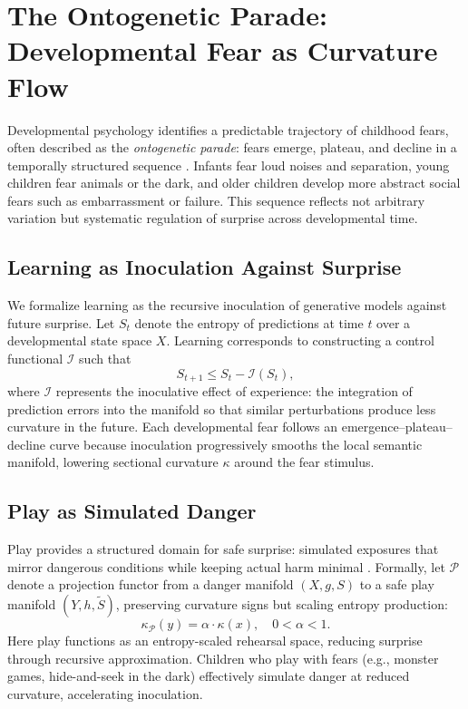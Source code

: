 \documentclass{article}
\theoremstyle{definition}
\begin{document}
\section{The Ontogenetic Parade: Developmental Fear as Curvature Flow}

Developmental psychology identifies a predictable trajectory of childhood fears,
often described as the \emph{ontogenetic parade}: fears emerge, plateau, and
decline in a temporally structured sequence \citep{king1998pathways, muris2000development, gullone2000developmental, muris2002ontogeny, field2001development}. Infants fear loud noises and
separation, young children fear animals or the dark, and older children develop
more abstract social fears such as embarrassment or failure. This sequence
reflects not arbitrary variation but systematic regulation of surprise across
developmental time.

\subsection{Learning as Inoculation Against Surprise}

We formalize learning as the recursive inoculation of generative models against
future surprise. Let $S_t$ denote the entropy of predictions at time $t$ over a
developmental state space $X$. Learning corresponds to constructing a control
functional $\mathcal{I}$ such that
\[
S_{t+1} \leq S_t - \mathcal{I}(S_t),
\]
where $\mathcal{I}$ represents the inoculative effect of experience: the
integration of prediction errors into the manifold so that similar perturbations
produce less curvature in the future. Each developmental fear follows an
emergence--plateau--decline curve because inoculation progressively smooths the
local semantic manifold, lowering sectional curvature $\kappa$ around the fear
stimulus.

\subsection{Play as Simulated Danger}

Play provides a structured domain for safe surprise: simulated exposures that
mirror dangerous conditions while keeping actual harm minimal \citep{sandseter2011children, spencer2003play}. Formally, let
$\mathcal{P}$ denote a projection functor from a danger manifold
$(X, g, S)$ to a safe play manifold $(Y, h, \tilde S)$, preserving curvature
signs but scaling entropy production:
\[
\kappa_{\mathcal{P}}(y) = \alpha \cdot \kappa(x), \quad 0 < \alpha < 1.
\]
Here play functions as an entropy-scaled rehearsal space, reducing surprise
through recursive approximation. Children who play with fears (e.g., monster
games, hide-and-seek in the dark) effectively simulate danger at reduced
curvature, accelerating inoculation.
\end{document}
